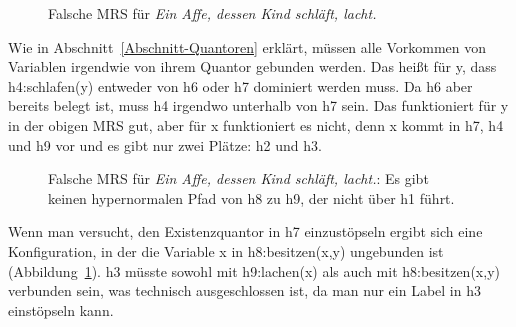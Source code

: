 \begin{figure}

\caption{Falsche MRS für \emph{Ein Affe, dessen Kind schläft, lacht.}}\label{Abbildung dessen Kind-falsch}
\end{figure}

Wie in Abschnitt~\ref{Abschnitt-Quantoren} erklärt, müssen alle Vorkommen von Variablen irgendwie von
ihrem Quantor gebunden werden. Das heißt für y, dass h4:schlafen(y) entweder von h6 oder h7 dominiert
werden muss. Da h6 aber bereits belegt ist, muss h4 irgendwo unterhalb von h7 sein. Das funktioniert
für y in der obigen MRS gut, aber für x funktioniert es nicht, denn x kommt in h7, h4 und h9 vor und
es gibt nur zwei Plätze: h2 und h3.
\begin{figure}
\caption{Falsche MRS für \emph{Ein Affe, dessen Kind schläft, lacht.}: Es gibt keinen hypernormalen
  Pfad von h8 zu h9, der nicht über h1 führt.}\label{Abbildung dessen Kind-falsche-MRS}
\end{figure}
Wenn man versucht, den Existenzquantor in h7 einzustöpseln ergibt sich eine Konfiguration, in der
die Variable x in h8:besitzen(x,y) ungebunden ist (Abbildung~\ref{Abbildung dessen Kind-falsch}). h3 müsste sowohl mit h9:lachen(x) als auch mit
h8:besitzen(x,y) verbunden sein, was technisch ausgeschlossen ist, da man nur ein Label in h3
einstöpseln kann.


